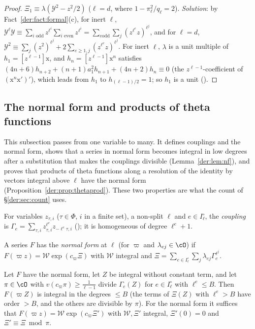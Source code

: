 \begin{proof}
$\Xi_1\equiv\lambda(\mathcal Y^2-z^2/2)$ ($\ell=d$, where $1-\pi_\ell^2/q_\ell=2$).
\emph{Solution}: by Fact~\ref{der:fact:formal}(c), for inert $\ell$,
$\mathcal Y^\ell\mathcal Y\equiv\sum_{i\text{ odd}}z^{\ell^i}\sum_{i\text{ even}}z^{\ell^i}=\sum_{e\text{
odd}}\sum_j(z^{\ell^e}z)^{\ell^j}$, and for $\ell=d$, $\mathcal Y^2\equiv\sum_j(z^2)^{\ell^j}+2\sum_{e\ge1,j}
(z^{\ell^e}z)^{\ell^j}$. For inert $\ell$, $\lambda$ is a unit multiple of $h_1=[z^{\ell-1}]\mathrm x$, and
$h_n=[z^{\ell-1}]\mathrm x^n$ satisfies $(4n+6)h_{n+2}+(n+1)a_1^2h_{n+1}+(4n+2)h_n\equiv0$ (the
$z^{\ell-1}$-coefficient of $(\mathrm x^n\mathrm x')'$), which leads from $h_1$ to $h_{(\ell-1)/2}=1$; so
$h_1$ is a unit ().
\end{proof}

\subsection{The normal form and products of theta functions}\label{der:sec:normal}

This subsection passes from one variable to many. It defines couplings and the normal form, shows
that a series in normal form becomes integral in low degrees after a substitution that makes the
couplings divisible (Lemma~\ref{der:lem:nf}), and proves that products of theta functions along a resolution
of the identity by vectors integral above $\ell$ have the normal form
(Proposition~\ref{der:prop:thetaprod}). These two properties
are what the count of \S\ref{der:sec:count} uses.

For variables $z_{\tau,i}$ ($\tau\in\Phi$, $i$ in a finite set), a non-split $\ell$ and
$e\in I_\ell^\circ$, the \emph{coupling} is
$\Gamma_e=\sum_{\tau,i}z_{\tau,i}^{\ell^e}z_{-\ell^e\tau,i}$ (); it is
homogeneous of degree $\ell^e+1$.

\begin{definition}
A series $F$ has the \emph{normal form} at $\ell$ (for $\varpi$ and $\lambda_{ej}\in\cO$) if
$F(\varpi z)=\mathcal W\exp(c_\varpi\Xi)$ with $\mathcal W$ integral and
$\Xi=\sum_{e\in I_\ell^\circ}\sum_j\lambda_{ej}\Gamma_e^{\ell^j}$.
\end{definition}

\begin{lemma}
\label{der:lem:nf}
Let $F$ have the normal form, let $Z$ be integral without constant term, and let $\pi\in\cO$ with
$v(c_\varpi\pi)\ge\frac1{\ell-1}$ divide $\Gamma_e(Z)$ for $e\in I_\ell^\circ$ with $\ell^e\le B$.
Then $F(\varpi Z)$ is integral in the degrees $\le B$ (the terms of $\Xi(Z)$ with $\ell^e>B$ have
order $>B$, and the others are divisible by $\pi$). For the normal form it suffices that
$F(\varpi z)=\mathcal W\exp(c_\varpi\Xi')$ with $\mathcal W,\Xi'$ integral, $\Xi'(0)=0$ and
$\Xi'\equiv\Xi\bmod\pi$.
\end{lemma}

